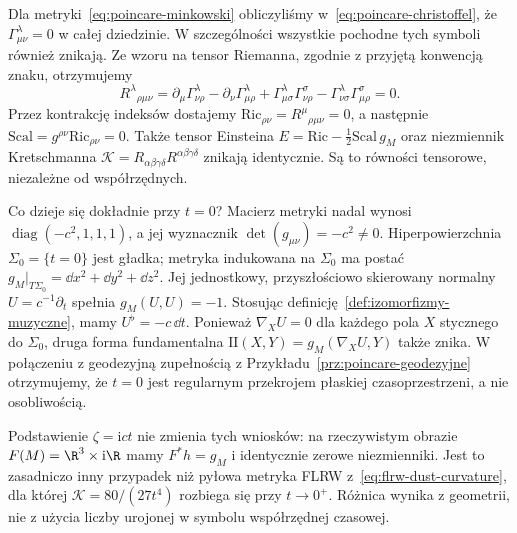 
\begin{przyklad}[krzywizna Poincarégo i regularność przy $t=0$]
\label{prz:poincare-krzywizna}
Dla metryki~\eqref{eq:poincare-minkowski} obliczyliśmy
w~\eqref{eq:poincare-christoffel}, że
$\Gamma^\lambda_{\mu\nu}=0$ w całej dziedzinie.
W szczególności wszystkie pochodne tych symboli
również znikają. Ze wzoru na tensor Riemanna,
zgodnie z przyjętą konwencją znaku, otrzymujemy
\begin{equation}\label{eq:poincare-riemann-zero}
 R^\lambda{}_{\rho\mu\nu}
 =\partial_\mu\Gamma^\lambda_{\nu\rho}
 -\partial_\nu\Gamma^\lambda_{\mu\rho}
 +\Gamma^\lambda_{\mu\sigma}\Gamma^\sigma_{\nu\rho}
 -\Gamma^\lambda_{\nu\sigma}\Gamma^\sigma_{\mu\rho}
 =0.
\end{equation}
Przez kontrakcję indeksów dostajemy
$\mathrm{Ric}_{\rho\nu}=R^\mu{}_{\rho\mu\nu}=0$,
a następnie $\mathrm{Scal}=g^{\rho\nu}\mathrm{Ric}_{\rho\nu}=0$.
Także tensor Einsteina
$E=\mathrm{Ric}-\frac12\mathrm{Scal}\,g_M$ oraz
niezmiennik Kretschmanna
$\mathcal K=R_{\alpha\beta\gamma\delta}
 R^{\alpha\beta\gamma\delta}$ znikają identycznie.
Są to równości tensorowe, niezależne od współrzędnych.

Co dzieje się dokładnie przy $t=0$?
Macierz metryki nadal wynosi
$\operatorname{diag}(-c^2,1,1,1)$, a jej wyznacznik
$\det(g_{\mu\nu})=-c^2\ne0$.
Hiperpowierzchnia $\Sigma_0=\{t=0\}$ jest gładka;
metryka indukowana na $\Sigma_0$ ma postać
$g_M|_{T\Sigma_0}=\dd x^2+\dd y^2+\dd z^2$.
Jej jednostkowy, przyszłościowo skierowany normalny
$U=c^{-1}\partial_t$ spełnia $g_M(U,U)=-1$.
Stosując definicję~\ref{def:izomorfizmy-muzyczne},
mamy $U^\flat=-c\,\dd t$.
Ponieważ $\nabla_XU=0$ dla każdego pola $X$
stycznego do $\Sigma_0$, druga forma fundamentalna
$\mathrm{II}(X,Y)=g_M(\nabla_XU,Y)$ także znika.
W połączeniu z geodezyjną zupełnością z
Przykładu~\ref{prz:poincare-geodezyjne} otrzymujemy,
że $t=0$ jest regularnym przekrojem płaskiej
czasoprzestrzeni, a nie osobliwością.

Podstawienie $\zeta=\mathrm{i}ct$ nie zmienia tych
wniosków: na rzeczywistym obrazie
$F(M)=\R^3\times\mathrm{i}\R$ mamy
$F^*h=g_M$ i identycznie zerowe niezmienniki.
Jest to zasadniczo inny przypadek niż pyłowa metryka
FLRW z~\eqref{eq:flrw-dust-curvature}, dla której
$\mathcal K=80/(27t^4)$ rozbiega się przy $t\to0^+$.
Różnica wynika z geometrii, nie z użycia liczby
urojonej w symbolu współrzędnej czasowej.
\end{przyklad}

